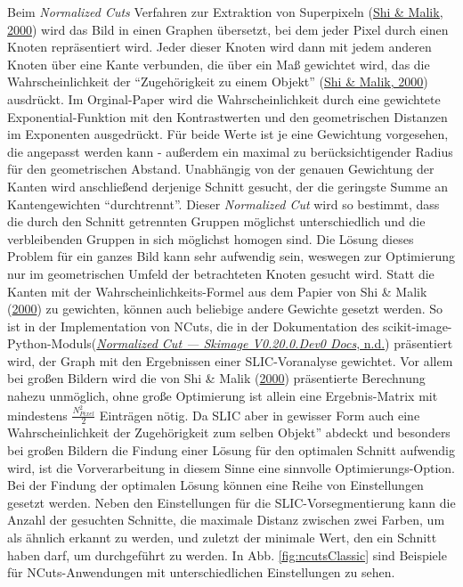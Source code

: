 \documentclass[
  12pt,
  openany]{book}
\begin{document}
Beim \emph{Normalized Cuts} Verfahren zur Extraktion von Superpixeln (\protect\hyperlink{ref-shiNormalizedCutsImage2000}{Shi \& Malik, 2000}) wird das Bild in einen Graphen übersetzt, bei dem jeder Pixel durch einen Knoten repräsentiert wird. Jeder dieser Knoten wird dann mit jedem anderen Knoten über eine Kante verbunden, die über ein Maß gewichtet wird, das die Wahrscheinlichkeit der ``Zugehörigkeit zu einem Objekt'' (\protect\hyperlink{ref-shiNormalizedCutsImage2000}{Shi \& Malik, 2000}) ausdrückt.
Im Orginal-Paper wird die Wahrscheinlichkeit durch eine gewichtete Exponential-Funktion mit den Kontrastwerten und den geometrischen Distanzen im Exponenten ausgedrückt. Für beide Werte ist je eine Gewichtung vorgesehen, die angepasst werden kann - außerdem ein maximal zu berücksichtigender Radius für den geometrischen Abstand.\newline
Unabhängig von der genauen Gewichtung der Kanten wird anschließend derjenige Schnitt gesucht, der die geringste Summe an Kantengewichten ``durchtrennt''. Dieser \emph{Normalized Cut} wird so bestimmt, dass die durch den Schnitt getrennten Gruppen möglichst unterschiedlich und die verbleibenden Gruppen in sich möglichst homogen sind. Die Lösung dieses Problem für ein ganzes Bild kann sehr aufwendig sein, weswegen zur Optimierung nur im geometrischen Umfeld der betrachteten Knoten gesucht wird.
Statt die Kanten mit der Wahrscheinlichkeits-Formel aus dem Papier von Shi \& Malik (\protect\hyperlink{ref-shiNormalizedCutsImage2000}{2000}) zu gewichten, können auch beliebige andere Gewichte gesetzt werden. So ist in der Implementation von NCuts, die in der Dokumentation des scikit-image-Python-Moduls(\protect\hyperlink{ref-NormalizedCutSkimage}{\emph{Normalized {Cut} --- Skimage V0.20.0.Dev0 Docs}, n.d.}) präsentiert wird, der Graph mit den Ergebnissen einer SLIC-Voranalyse gewichtet. Vor allem bei großen Bildern wird die von Shi \& Malik (\protect\hyperlink{ref-shiNormalizedCutsImage2000}{2000}) präsentierte Berechnung nahezu unmöglich, ohne große Optimierung ist allein eine Ergebnis-Matrix mit mindestens \(\frac{N_{Pixel}^2}{2}\) Einträgen nötig.\newline
Da SLIC aber in gewisser Form auch eine \glqq{}Wahrscheinlichkeit der Zugehörigkeit zum selben Objekt'' abdeckt und besonders bei großen Bildern die Findung einer Lösung für den optimalen Schnitt aufwendig wird, ist die Vorverarbeitung in diesem Sinne eine sinnvolle Optimierungs-Option.
Bei der Findung der optimalen Lösung können eine Reihe von Einstellungen gesetzt werden. Neben den Einstellungen für die SLIC-Vorsegmentierung kann die Anzahl der gesuchten Schnitte, die maximale Distanz zwischen zwei Farben, um als ähnlich erkannt zu werden, und zuletzt der minimale Wert, den ein Schnitt haben darf, um durchgeführt zu werden. \newline
In Abb. \ref{fig:ncutsClassic} sind Beispiele für NCuts-Anwendungen mit unterschiedlichen Einstellungen zu sehen.
\end{document}

